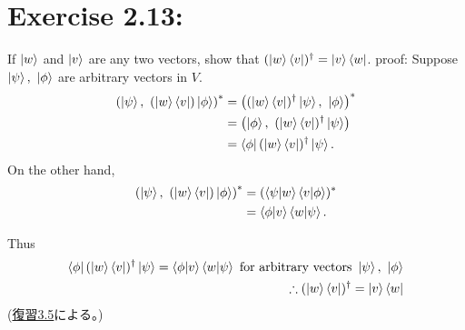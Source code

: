 \section{\Large Exercise 2.13:}If $\ket{w}$ and $\ket{v}$ are any two vectors,
show that $(\ket{w}\bra{v})^\dagger = \ket{v}\bra{w}$.
\newline
{\large proof:}
Suppose $\ket{\psi},\ \ket{\phi}$ are arbitrary vectors in $V$. 
\begin{align*}
        \left(\ket{\psi},\ (\ket{w}\bra{v}) \ket{\phi}\right)^* &=
        \left((\ket{w}\bra{v})^\dagger \ket{\psi},\  \ket{\phi}\right)^*\\
        &= \left(\ket{\phi},\ (\ket{w}\bra{v})^\dagger \ket{\psi} \right)\\
        &= \bra{\phi} (\ket{w}\bra{v})^\dagger \ket{\psi}.
\end{align*}
On the other hand,
\begin{align*}
        \left(\ket{\psi},\ (\ket{w}\bra{v}) \ket{\phi}\right)^*
        &= (\braket{\psi | w} \braket{v | \phi})^*\\
        &= \braket{\phi | v} \braket{w | \psi}.
\end{align*}

Thus
\begin{align*}
        \bra{\phi} (\ket{w}\bra{v})^\dagger \ket{\psi} = \braket{\phi | v} \braket{w | \psi} \text{ for arbitrary vectors } \ket{\psi},\ \ket{\phi}\\
        \therefore (\ket{w}\bra{v})^\dagger = \ket{v}\bra{w}
\end{align*}
(\hyperlink{hukushuu3.5}{復習3.5}による。)
